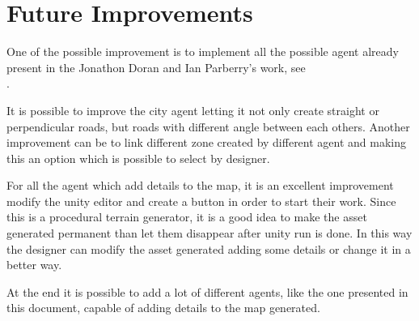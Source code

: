 \documentclass[12pt]{article}
\begin{document}
    \newpage

    \section{Future Improvements}
    One of the possible improvement is to implement all the possible agent already present in the Jonathon Doran and Ian Parberry's work,
    see \\ \cite{article}.
    
    It is possible to improve the city agent letting it not only create straight or perpendicular roads, but roads with different angle between each
    others. Another improvement can be to link different zone created by different agent and making this an option which is possible to select by designer.

    For all the agent which add details to the map, it is an excellent improvement modify the unity editor and create a button in order to start their work. 
    Since this is a procedural terrain generator, it is a good idea to make the asset generated permanent than let them disappear after unity run is done.
    In this way the designer can modify the asset generated adding some details or change it in a better way.

    At the end it is possible to add a lot of different agents, like the one presented in this document, capable of adding details to the map generated. 

    \newpage
    
    
\end{document}
